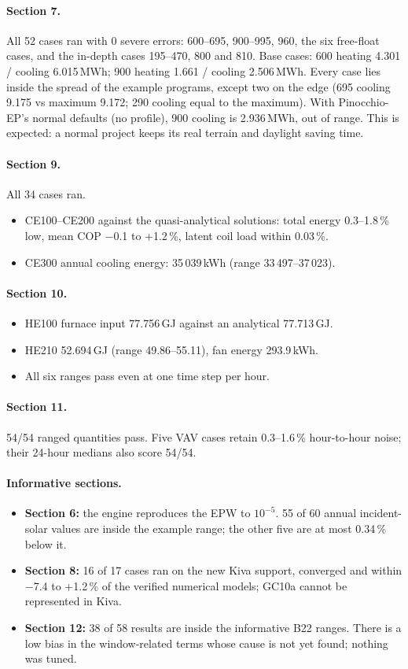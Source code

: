 \documentclass[10pt,a4paper]{article}
\begin{document}
\paragraph{Section 7.} All 52 cases ran with 0 severe errors: 600--695, 900--995, 960, the six free-float cases, and
the in-depth cases 195--470, 800 and 810. Base cases: 600 heating 4.301 / cooling 6.015\,MWh; 900 heating 1.661 /
cooling 2.506\,MWh. Every case lies inside the spread of the example programs, except two on the edge
(695 cooling 9.175 vs maximum 9.172; 290 cooling equal to the maximum). With Pinocchio-EP's normal defaults (no
profile), 900 cooling is 2.936\,MWh, out of range. This is expected: a normal project keeps its real terrain and
daylight saving time.

\paragraph{Section 9.} All 34 cases ran.
\begin{itemize}
\item CE100--CE200 against the quasi-analytical solutions: total energy 0.3--1.8\,\% low, mean COP $-$0.1 to +1.2\,\%,
latent coil load within 0.03\,\%.
\item CE300 annual cooling energy: 35\,039\,kWh (range 33\,497--37\,023).
\end{itemize}
\paragraph{Section 10.}
\begin{itemize}
\item HE100 furnace input 77.756\,GJ against an analytical 77.713\,GJ.
\item HE210 52.694\,GJ (range 49.86--55.11), fan energy 293.9\,kWh.
\item All six ranges pass even at one time step per hour.
\end{itemize}
\paragraph{Section 11.} 54/54 ranged quantities pass. Five VAV cases retain 0.3--1.6\,\% hour-to-hour noise; their
24-hour medians also score 54/54.

\paragraph{Informative sections.}
\begin{itemize}
\item \textbf{Section 6:} the engine reproduces the EPW to $10^{-5}$. 55 of 60 annual incident-solar values are
inside the example range; the other five are at most 0.34\,\% below it.
\item \textbf{Section 8:} 16 of 17 cases ran on the new Kiva support, converged and within $-$7.4 to +1.2\,\% of
the verified numerical models; GC10a cannot be represented in Kiva.
\item \textbf{Section 12:} 38 of 58 results are inside the informative B22 ranges. There is a low bias in the
window-related terms whose cause is not yet found; nothing was tuned.
\end{itemize}
\end{document}
